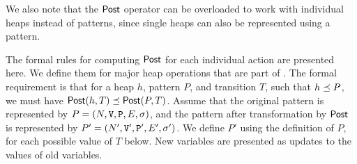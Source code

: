We also note that the $\mathsf{Post}$ operator can be overloaded to work with individual heaps
instead of patterns, since single heaps can also be represented using a pattern.

The formal rules for computing $\mathsf{Post}$ for each individual action are presented here. We
define them for major heap operations that are part of \lang. The formal requirement is
that for a heap $h$, pattern $P$, and transition $T$, such that $h \preceq P$, we must
have $\mathsf{Post}(h, T) \preceq \mathsf{Post}(P, T)$. Assume that the original pattern is represented
by $P = (N, \mathtt{V}, \mathtt{P}, E, \sigma)$, and the pattern after
transformation by $\mathsf{Post}$ is represented by
$P' = (N', \mathtt{V}', \mathtt{P}', E', \sigma')$. We define $P'$ using the
definition of $P$, for each possible value of $T$ below. New variables are presented as
updates to the values of old variables.

